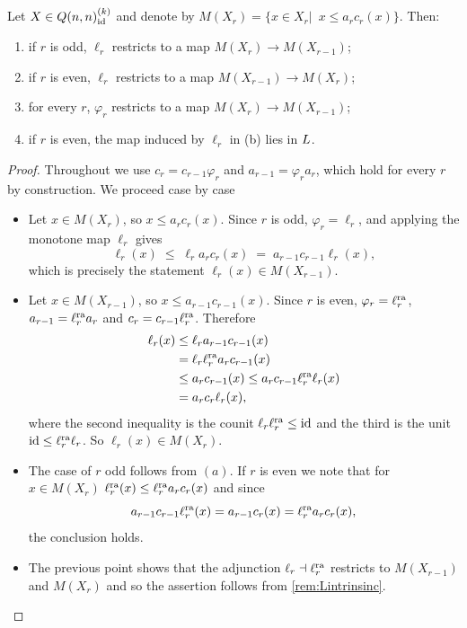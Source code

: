 \documentclass[a4paper,reqno,twoside]{amsart}
\begin{document}
\begin{lemma}\label{lem:restrict}
Let $X \in Q(n,n)^{(k)}_{\mathrm{id}}$ and denote by $M(X_r)=\{x \in X_r | \enspace x \leq a_rc_r(x)\}$. Then:
\begin{enumerate}
  \item[(a)] if $r$ is odd, $\ell_r$ restricts to a map $M(X_r) \to M(X_{r-1})$;
  \item[(b)] if $r$ is even, $\ell_r$ restricts to a map $M(X_{r-1}) \to M(X_r)$;
  \item[(c)] for every $r$, $\varphi_r$ restricts to a map $M(X_r) \to M(X_{r-1})$;
  \item[(d)] if $r$ is even, the map induced by $\ell_r$ in (b) lies in $\relax{L}$.
\end{enumerate}
\end{lemma}
\begin{proof}
Throughout we use $c_r = c_{r-1}\varphi_r$ and $a_{r-1} = \varphi_r a_r$, which
hold for every $r$ by construction. We proceed case by case
\begin{itemize}
	\item[$(a)$] Let $x \in M(X_r)$, so $x \le a_rc_r(x)$. Since $r$ is odd,
$\varphi_r = \ell_r$, and applying the monotone map $\ell_r$ gives
\[
  \ell_r(x) \;\le\; \ell_r a_r c_r(x) \;=\; a_{r-1} c_{r-1}\ell_r(x),
\]
which is precisely the statement $\ell_r(x) \in M(X_{r-1})$.
\item[$(b)$] Let $x \in M(X_{r-1})$, so $x \le a_{r-1}c_{r-1}(x)$. Since $r$ is even, $\varphi_r = \ell_r^{\mathrm{ra}}$, $a_{r-1} = \ell_r^{\mathrm{ra}}a_r$ and
$c_r = c_{r-1}\ell_r^{\mathrm{ra}}$. Therefore
\[
	\begin{aligned}
		\ell_r(x)
		&\leq \ell_r a_{r-1}c_{r-1}(x) \\
		&= \ell_r\ell_r^{\mathrm{ra}}a_rc_{r-1}(x) \\
		&\leq a_rc_{r-1}(x)
		 \leq a_rc_{r-1}\ell_r^{\mathrm{ra}}\ell_r(x) \\
		&= a_rc_r\ell_r(x),
	\end{aligned}
\]
where the second inequality is the counit $\ell_r\ell_r^{\mathrm{ra}} \le \mathrm{id}$ and the
third is the unit $\mathrm{id} \le \ell_r^{\mathrm{ra}}\ell_r$. So $\ell_r(x) \in M(X_r)$.
\item[$(c)$] The case of $r$ odd follows from $(a)$. If $r$ is even we note that for $x \in M(X_r)$ $\ell_r^{\mathrm{ra}}(x) \leq \ell_r^{\mathrm{ra}}a_rc_r(x)$ and since
   \[
	a_{r-1}c_{r-1}\ell_r^{\mathrm{ra}}(x)=a_{r-1} c_r(x)=\ell_r^{\mathrm{ra}} a_r c_r(x),
   \]
   the conclusion holds.
\item[$(d)$] The previous point shows that the adjunction $\ell_r \dashv \ell_r^{\mathrm{ra}}$ restricts to $M(X_{r-1})$ and $M(X_r)$ and so the assertion follows from \cref{rem:Lintrinsinc}.\qedhere
\end{itemize}
\end{proof}
\end{document}
